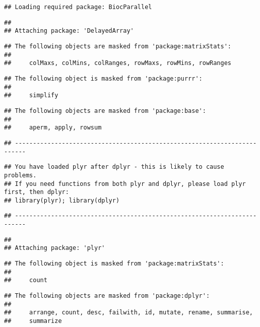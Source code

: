 \documentclass[]{article}
\begin{document}
\begin{verbatim}
## Loading required package: BiocParallel
\end{verbatim}

\begin{verbatim}
## 
## Attaching package: 'DelayedArray'
\end{verbatim}

\begin{verbatim}
## The following objects are masked from 'package:matrixStats':
## 
##     colMaxs, colMins, colRanges, rowMaxs, rowMins, rowRanges
\end{verbatim}

\begin{verbatim}
## The following object is masked from 'package:purrr':
## 
##     simplify
\end{verbatim}

\begin{verbatim}
## The following objects are masked from 'package:base':
## 
##     aperm, apply, rowsum
\end{verbatim}

\begin{verbatim}
## -------------------------------------------------------------------------
\end{verbatim}

\begin{verbatim}
## You have loaded plyr after dplyr - this is likely to cause problems.
## If you need functions from both plyr and dplyr, please load plyr first, then dplyr:
## library(plyr); library(dplyr)
\end{verbatim}

\begin{verbatim}
## -------------------------------------------------------------------------
\end{verbatim}

\begin{verbatim}
## 
## Attaching package: 'plyr'
\end{verbatim}

\begin{verbatim}
## The following object is masked from 'package:matrixStats':
## 
##     count
\end{verbatim}

\begin{verbatim}
## The following objects are masked from 'package:dplyr':
## 
##     arrange, count, desc, failwith, id, mutate, rename, summarise,
##     summarize
\end{verbatim}
\end{document}
